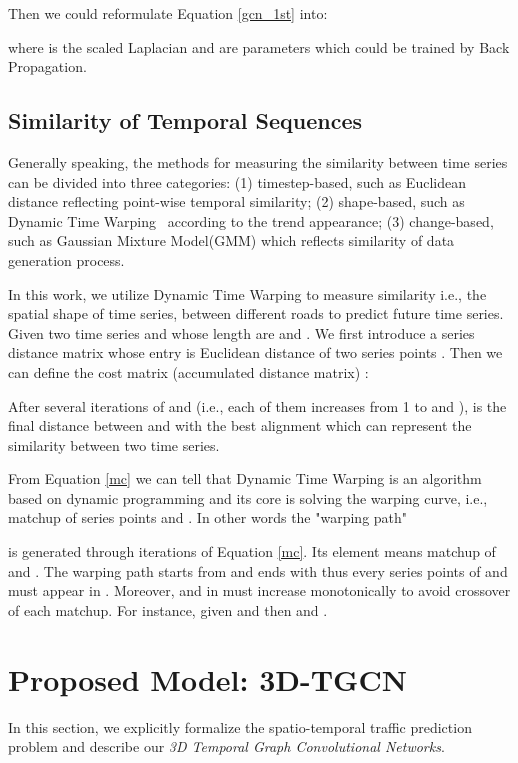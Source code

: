 \documentclass{article}
\begin{document}
Then we could reformulate Equation \ref{gcn_1st} into:


where  is the scaled Laplacian and  are parameters which could be trained by Back Propagation.



\subsection{Similarity of Temporal Sequences}
 Generally speaking, the methods for measuring the similarity between time series can be divided into three categories: (1) timestep-based, such as Euclidean distance reflecting point-wise temporal similarity; (2) shape-based, such as Dynamic Time Warping~\cite{berndt1994using} according to the trend appearance; (3) change-based, such as Gaussian Mixture Model(GMM)\cite{povinelli2004time} which reflects similarity of data generation process. 

In this work, we utilize Dynamic Time Warping to measure similarity  i.e., the spatial shape of time series, between different roads to predict future time series. Given two time series  and  whose length are  and . We first introduce a series distance matrix  whose entry is Euclidean distance of two series points . Then we can define the cost matrix (accumulated distance matrix) {}:
\begin{small}

\end{small}

After several iterations of  and  (i.e., each of them increases from 1 to  and ),  is the final distance between  and  with the best alignment which can represent the similarity between two time series.

From Equation \ref{mc} we can tell that Dynamic Time Warping is an algorithm based on dynamic programming and its core is solving the warping curve, i.e., matchup of series points  and . In other words the "warping path"

is generated through iterations of Equation \ref{mc}. Its element  means matchup of  and . The warping path  starts from  and ends with  thus every series points of  and  must appear in . Moreover,  and  in  must increase monotonically to avoid crossover of each matchup. For instance, given  and  then  and .

\section{Proposed Model: 3D-TGCN}
In this section, we explicitly formalize the spatio-temporal traffic prediction problem and describe our \textit{3D Temporal Graph Convolutional Networks}.
\end{document}
